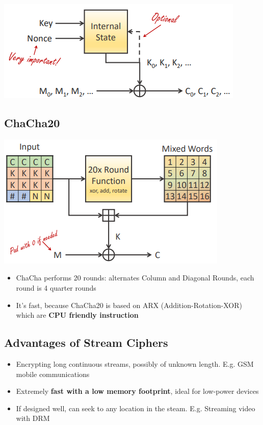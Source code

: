 \documentclass{article}
\begin{document}
\begin{center}
  \includegraphics[scale=0.5]{modern_cyphers.png}
\end{center}

\subsection{ChaCha20}

\begin{center}
  \includegraphics[scale=0.5]{chacha.png}
\end{center}
\begin{itemize}
  \item ChaCha performs 20 rounds: alternates Column and Diagonal Rounds, each round is 4 quarter rounds
  \item It's fast, because ChaCha20 is based on ARX (Addition-Rotation-XOR) which are \textbf{CPU friendly instruction}
\end{itemize}

\subsection{Advantages of Stream Ciphers}
\begin{itemize}
  \item Encrypting long continuous streams, possibly of unknown length. E.g. GSM mobile communications 
  \item Extremely \textbf{fast with a low memory footprint}, ideal for low-power devices 
  \item If designed well, can seek to any location in the steam. E.g. Streaming video with DRM
\end{itemize}
\end{document}
